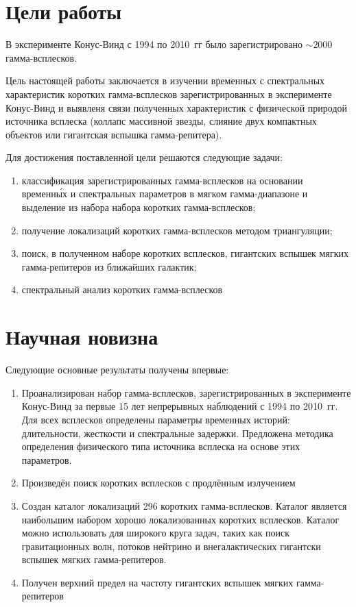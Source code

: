 \section{Цели работы}
В эксперименте Конус-Винд с 1994 по 2010~гг было зарегистрировано $\sim 2000$ гамма-всплесков. 

Цель настоящей работы заключается в изучении временных с спектральных характеристик 
коротких гамма-всплесков зарегистрированных в эксперименте Конус-Винд и выявленя 
связи полученных характеристик с физической природой источника всплеска 
(коллапс массивной звезды, слияние двух компактных объектов или гигантская вспышка гамма-репитера).

Для достижения поставленной цели решаются следующие задачи:
\begin{enumerate}
\item классификация зарегистрированных гамма-всплесков на основании временн\'{ы}х 
и спектральных параметров в мягком гамма-диапазоне и выделение из набора набора коротких гамма-всплесков; 
\item получение локализаций коротких гамма-всплесков методом триангуляции; 
\item поиск, в полученном наборе коротких всплесков, гигантских 
вспышек мягких гамма-репитеров из ближайших галактик;
\item спектральный анализ коротких гамма-всплесков
\end{enumerate}

\section{Научная новизна}
Следующие основные результаты получены впервые:
\begin{enumerate}
\item Проанализирован набор гамма-всплесков, зарегистрированных в эксперименте 
Конус-Винд за первые 15 лет непрерывных наблюдений с 1994 по 2010~гг. Для всех 
всплесков определены параметры временных историй: длительности, жесткости и спектральные задержки.
Предложена методика определения физического типа источника всплеска на основе этих параметров.

\item Произведён поиск коротких всплесков с продлённым излучением 

\item Создан каталог локализаций 296 коротких гамма-всплесков. Каталог является 
наибольшим набором хорошо локализованных коротких всплесков. Каталог можно использовать 
для широкого круга задач, таких как поиск гравитационных волн, потоков нейтрино 
и внегалактических гигантски вспышек мягких гамма-репитеров.

\item Получен верхний предел на частоту гигантских вспышек мягких гамма-репитеров

\end{enumerate}

